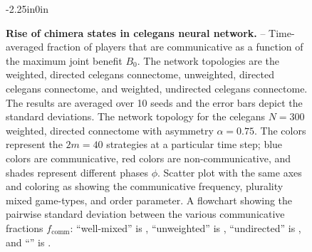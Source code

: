 \documentclass[10pt,letterpaper]{article}
\begin{document}
\begin{figure}
\begin{adjustwidth}{-2.25in}{0in}
  \centering
  \begin{subcaptiongroup}
      {\label{fig:standard_deviation}\captiontext*{}}{%
      {\label{fig:time-series_celegans-full}\captiontext*{}}{%
      {\label{fig:graph}\captiontext*{}}{%
      {\label{fig:comm-frac_celegans-undirected}\captiontext*{}}{%
      {\label{fig:comm-frac_celegans-unweighted}\captiontext*{}}{%
      {\label{fig:comm-frac_celegans-full}\captiontext*{}}{%
    {}%
  }}}}}}
  \end{subcaptiongroup}
  \caption{
    \textbf{
      Rise of chimera states in \gls{celegans} neural network.
    }
    --
    Time-averaged fraction of players that are communicative as a function
    of the maximum joint benefit $B_0$.
    The network topologies are the
    weighted, directed \gls{celegans} connectome,
    unweighted, directed \gls{celegans} connectome,
    and
    weighted, undirected \gls{celegans} connectome.
		The results are averaged over 10 seeds
		and the error bars depict the standard deviations.
    The network topology for the \gls{celegans}
    $N=300$ weighted, directed connectome
    with asymmetry $\alpha = 0.75$.
    The colors represent the $2m = 40$ strategies
    at a particular time step;
    blue colors are communicative,
    red colors are non-communicative,
    and shades represent different phases $\phi$.
    Scatter plot with the same axes and coloring
    as 
    showing the communicative frequency, plurality mixed game-types, and order parameter.
		A flowchart showing the pairwise standard deviation between the various communicative
		fractions $f_{\text{comm}}$:
		``well-mixed'' is ,
		``unweighted'' is ,
		``undirected'' is ,
		and
		``'' is .
  }\label{fig:c-elegans}
\end{adjustwidth}
\end{figure}
\end{document}
